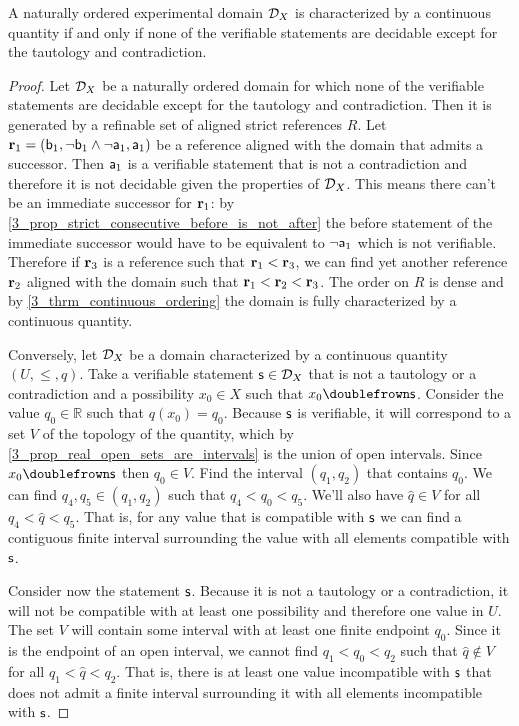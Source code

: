 \documentclass[11pt,letterpaper,fleqn]{memoir} %
\begin{document}
\begin{mathSection}
\begin{prop}
	A naturally ordered experimental domain $\edomain_X$ is characterized by a continuous quantity if and only if none of the verifiable statements are decidable except for the tautology and contradiction.
\end{prop}
\begin{proof}
	Let $\edomain_X$ be a naturally ordered domain for which none of the verifiable statements are decidable except for the tautology and contradiction. Then it is generated by a refinable set of aligned strict references $R$. Let $\refStmt_1=(\stmt[b]_1, \NOT \stmt[b]_1 \AND \NOT \stmt[a]_1, \stmt[a]_1)$ be a reference aligned with the domain that admits a successor. Then $\stmt[a]_1$ is a verifiable statement that is not a contradiction and therefore it is not decidable given the properties of $\edomain_X$. This means there can't be an immediate successor for $\refStmt_1$: by \ref{3_prop_strict_consecutive_before_is_not_after} the before statement of the immediate successor would have to be equivalent to $\NOT\stmt[a]_1$ which is not verifiable. Therefore if $\refStmt_3$ is a reference such that $\refStmt_1 < \refStmt_3$, we can find yet another reference $\refStmt_2$ aligned with the domain such that $\refStmt_1 < \refStmt_2 < \refStmt_3$. The order on $R$ is dense and by \ref{3_thrm_continuous_ordering} the domain is fully characterized by a continuous quantity.
	
	Conversely, let $\edomain_X$ be a domain characterized by a continuous quantity $(U, \leq, q)$. Take a verifiable statement $\stmt \in \edomain_X$ that is not a tautology or a contradiction and a possibility $x_0 \in X$ such that $x_0 \comp \stmt$. Consider the value $q_0 \in \mathbb{R}$ such that $q(x_0) = q_0$. Because $\stmt$ is verifiable, it will correspond to a set $V$ of the topology of the quantity, which by \ref{3_prop_real_open_sets_are_intervals} is the union of open intervals. Since $x_0 \comp \stmt$ then $q_0 \in V$. Find the interval $(q_1, q_2)$ that contains $q_0$. We can find $q_4, q_5 \in (q_1, q_2)$ such that $q_4 < q_0 < q_5$. We'll also have $\hat{q} \in V$ for all $q_4 < \hat{q} < q_5$. That is, for any value that is compatible with $\stmt$ we can find a contiguous finite interval surrounding the value with all elements compatible with $\stmt$.
	
	Consider now the statement $\stmt$. Because it is not a tautology or a contradiction, it will not be compatible with at least one possibility and therefore one value in $U$. The set $V$ will contain some interval with at least one finite endpoint $q_0$. Since it is the endpoint of an open interval, we cannot find $q_1 < q_0 < q_2$ such that $\hat{q} \notin V$ for all $q_1 < \hat{q} < q_2$. That is, there is at least one value incompatible with $\stmt$ that does not admit a finite interval surrounding it with all elements incompatible with $\stmt$.
	

\end{proof}
\end{mathSection}
\end{document}
